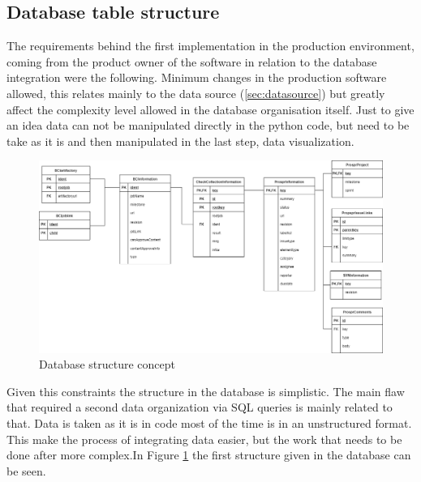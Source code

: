 \documentclass[../main.tex]{subfiles}
\begin{document}
\subsection{Database table structure}
The requirements behind the first implementation in the production environment, coming from the product owner of the software in relation to the database integration were the following. Minimum changes in the production software allowed, this relates mainly to the data source (\ref{sec:datasource}) but greatly affect the complexity level allowed in the database organisation itself. Just to give an idea data can not be manipulated directly in the python code, but need to be take as it is and then manipulated in the last step, data visualization. 
\begin{figure}[H]
    \centering
    \includegraphics[width=\linewidth]{images_folder/EADBEntity.png}
    \caption{Database structure concept}
    \label{fig:dbsterconce}
\end{figure}
Given this constraints the structure in the database is simplistic. The main flaw that required a second data organization via SQL queries is mainly related to that. Data is taken as it is in code most of the time is in an unstructured format.\\
This make the process of integrating data easier, but the work that needs to be done after more complex.In Figure \ref{fig:dbsterconce} the first structure given in the database can be seen.
\end{document}
